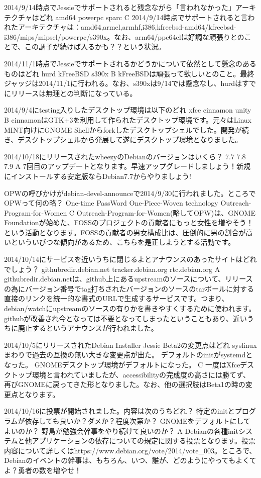%

\santaku
{2014/9/14時点でJessieでサポートされると残念ながら「言われなかった」アーキテクチャはどれ}
{amd64}
{powerpc}
{sparc}
{C}
{2014/9/14時点でサポートされると言われたアーキテクチャは：amd64,armel,armhf,i386,kfreebsd-amd64/kfreebsd-i386/mips/mipsel/powerpc/s390x。なお、arm64/ppc64elは好調な頑張りとのことで、この調子が続けば入るかも？？という状況。}

\santaku
{2014/11/1時点でJessieでサポートされるかどうかについて依然として懸念のあるものはどれ}
{hurd}
{kFreeBSD}
{s390x}
{B}
{kFreeBSDは頑張って欲しいとのこと。最終ジャッジは2014/11/1に行われる。なお、s390xは9/14では懸念なし、hurdはすでにリリースは無理との判断になっている。}

\santaku
{2014/9/4にtesting入りしたデスクトップ環境は以下のどれ}
{xfce}
{cinnamon}
{unity}
{B}
{cinnamonはGTK+3を利用して作られたデスクトップ環境です。元々はLinux MINT向けにGNOME Shellからforkしたデスクトップシェルでした。開発が続き、デスクトップシェルから発展して遂にデスクトップ環境となりました。}

\santaku
{2014/10/18にリリースされたwheezyのDebianのバージョンはいくら？}
{7.7}
{7.8}
{7.9}
{A}
{7回目のアップデートとなります。早速アップグレードしましょう！新規にインストールする安定版ならDebian7.7からやりましょう!}

\santaku
{OPWの呼びかけがdebian-devel-announceで2014/9/30に行われました。ところでOPWって何の略？}
{One-time PassWord}
{One-Piece-Woven technology}
{Outreach-Program-for-Women}
{C}
{Outreach-Program-for-Women(略してOPW)は、GNOME Foundationが始めた、FOSSのプロジェクトの貢献者にもっと女性を増やそう！という活動となります。FOSSの貢献者の男女構成比は、圧倒的に男の割合が高いといういびつな傾向があるため、こちらを是正しようとする活動です。}

\santaku
{2014/10/14にサービスを近いうちに閉じるよとアナウンスのあったサイトはどれでしょう？}
{githubredir.debian.net}
{tracker.debian.org}
{rtc.debian.org}
{A}
{githubredir.debian.netは、github上にあるupstreamのソースについて、リリースの為にバージョン番号でtag打ちされたバージョンのソースのtarボールに対する直接のリンクを統一的な書式のURLで生成するサービスです。つまり、debian/watchにupstreamのソースの有りかを書きやすくするために使われます。githubが改善され今となっては不要となってしまったということもあり、近いうちに廃止するというアナウンスが行われました。}

\santaku
{2014/10/5にリリースされたDebian Installer Jessie Beta2の変更点はどれ}
{syslinuxまわりで過去の互換の無い大きな変更点が出た。}
{デフォルトのinitがsystemdとなった。}
{GNOMEデスクトップ環境がデフォルトになった。}
{C}
{一度はXfceデスクトップ環境と言われていましたが、accessibilityの完成度の高さには勝てず、再びGNOMEに戻ってきた形となりました。なお、他の選択肢はBeta1の時の変更点となります。}

\santaku
{2014/10/16に投票が開始されました。内容は次のうちどれ？}
{特定のinitとプログラムが依存しても良いか？ダメか？程度次第か？}
{GNOMEをデフォルトにしてよいのか？}
{野島が勉強会幹事をやり続けて良いのか？}
{A}
{Debianの各種initシステムと他アプリケーションの依存についての規定に関する投票となります。投票内容について詳しくはhttps://www.debian.org/vote/2014/vote\_003。ところで、Debianのイベントの幹事は、もちろん、いつ、誰が、どのようにやってもよくてよ？勇者の数を増やせ！}
